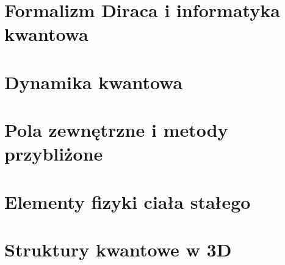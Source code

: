 \documentclass[11pt,a4paper]{report}
\begin{document}
\part{Formalizm Diraca i informatyka kwantowa}



\part{Dynamika kwantowa}



\part{Pola zewnętrzne i metody przybliżone}



\part{Elementy fizyki ciała stałego}



\part{Struktury kwantowe w 3D}



\appendix




\end{document}
